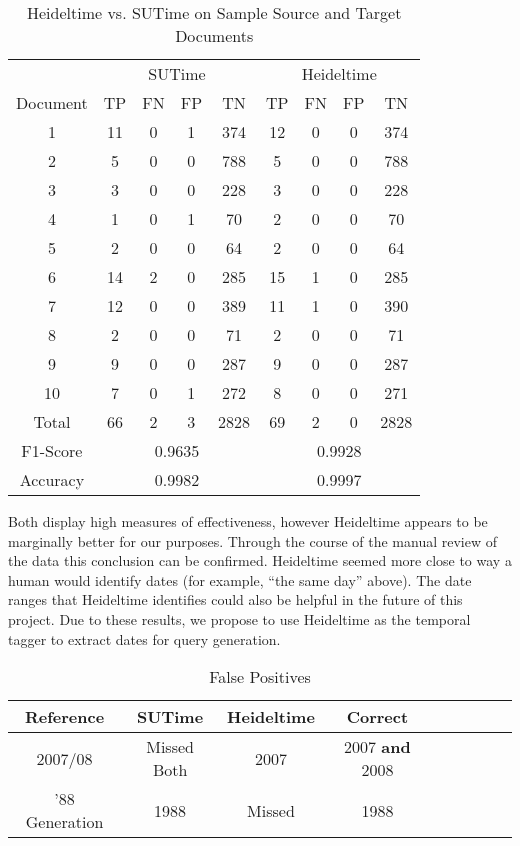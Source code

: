 \documentclass{mprop}
\begin{document}

\begin{table}[H]
\centering
\begin{tabular}{|c|c|c|c|c|c|c|c|c|}
\hline
& \multicolumn{4}{|c|}{SUTime}    & \multicolumn{4}{|c|}{Heideltime} \\ 
\cline{2-9}
Document & TP  & FN & FP & TN     & TP & FN & FP & TN    \\ \hline
1        & 11  & 0  & 1  & 374	  & 12 & 0  & 0  & 374   \\ \hline
2        & 5   & 0  & 0	 & 788 	  & 5  & 0  & 0  & 788   \\ \hline
3		 & 3   & 0  & 0  & 228	  & 3  & 0  & 0  & 228 	 \\ \hline
4        & 1   & 0  & 1	 & 70  	  & 2  & 0  & 0  & 70  	 \\ \hline
5	     & 2   & 0  & 0	 & 64     & 2  & 0  & 0  & 64    \\ \hline
6		 & 14  & 2  & 0	 & 285 	  & 15 & 1  & 0  & 285   \\ \hline
7		 & 12  & 0  & 0	 & 389 	  & 11 & 1  & 0  & 390 	 \\ \hline
8		 & 2   & 0  & 0	 & 71  	  & 2  & 0  & 0  & 71  	 \\ \hline
9		 & 9   & 0  & 0	 & 287 	  & 9  & 0  & 0  & 287 	 \\ \hline
10		 & 7   & 0  & 1	 & 272 	  & 8  & 0  & 0  & 271 	 \\ \hline
Total    & 66  & 2  & 3	 & 2828	  & 69 & 2  & 0  & 2828  \\ \hline
F1-Score & \multicolumn{4}{|c|}{0.9635} & \multicolumn{4}{|c|}{0.9928} \\ \hline
Accuracy & \multicolumn{4}{|c|}{0.9982} & \multicolumn{4}{|c|}{0.9997} \\ \hline
\end{tabular}
\caption{Heideltime vs. SUTime on Sample Source and Target Documents}
\label{temporalcomparison}
\end{table}
Both display high measures of effectiveness, however Heideltime appears to be marginally better for our purposes. 
Through the course of the manual review of the data this conclusion can be confirmed. 
Heideltime seemed more close to way a human would identify dates (for example, ``the same day'' above). 
The date ranges that Heideltime identifies could also be helpful in the future of this project. 
Due to these results, we propose to use Heideltime as the temporal tagger to extract dates for query generation.

\begin{table}[H]
\centering
\begin{tabular}{|c|c|c|c|c|c|c|c|c|}
\hline
Reference      & SUTime          & Heideltime  & Correct                \\ \hline
2007/08		   & Missed Both     & 2007        & 2007 \textbf{and} 2008 \\ \hline
'88 Generation & 1988            & Missed 	   & 1988  	   	            \\ \hline
\end{tabular}
\caption{False Positives}
\label{temporalcomparison}
\end{table}
\end{document}
